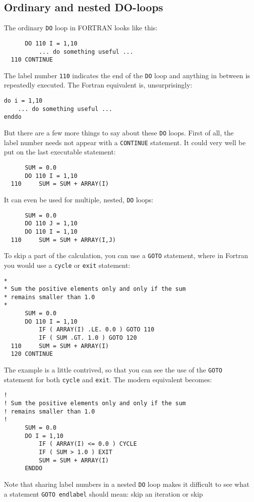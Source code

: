 \subsection{Ordinary and nested DO-loops}
The ordinary \verb+DO+ loop in FORTRAN looks like this:
%
\begin{verbatim}
      DO 110 I = 1,10
          ... do something useful ...
  110 CONTINUE
\end{verbatim}
%
The label number \verb+110+ indicates the end of the \verb+DO+ loop and anything in between
is repeatedly executed. The Fortran equivalent is, unsurprisingly:
%
\begin{verbatim}
do i = 1,10
    ... do something useful ...
enddo
\end{verbatim}
%
But there are a few more things to say about these \verb+DO+ loops. First of all, the
label number needs not appear with a \verb+CONTINUE+ statement. It could very well be
put on the last executable statement:
%
\begin{verbatim}
      SUM = 0.0
      DO 110 I = 1,10
  110     SUM = SUM + ARRAY(I)
\end{verbatim}
%
It can even be used for multiple, nested, \verb+DO+ loops:
%
\begin{verbatim}
      SUM = 0.0
      DO 110 J = 1,10
      DO 110 I = 1,10
  110     SUM = SUM + ARRAY(I,J)
\end{verbatim}
%
To skip a part of the calculation, you can use a \verb+GOTO+ statement, where in Fortran
you would use a \verb+cycle+ or \verb+exit+ statement:
%
\begin{verbatim}
*
* Sum the positive elements only and only if the sum
* remains smaller than 1.0
*
      SUM = 0.0
      DO 110 I = 1,10
          IF ( ARRAY(I) .LE. 0.0 ) GOTO 110
          IF ( SUM .GT. 1.0 ) GOTO 120
  110     SUM = SUM + ARRAY(I)
  120 CONTINUE
\end{verbatim}
%
The example is a little contrived, so that you can see the use of the \verb+GOTO+ statement
for both \verb+cycle+ and \verb+exit+. The modern equivalent becomes:
%
\begin{verbatim}
!
! Sum the positive elements only and only if the sum
! remains smaller than 1.0
!
      SUM = 0.0
      DO I = 1,10
          IF ( ARRAY(I) <= 0.0 ) CYCLE
          IF ( SUM > 1.0 ) EXIT
          SUM = SUM + ARRAY(I)
      ENDDO
\end{verbatim}
%
Note that sharing label numbers in a nested \verb+DO+ loop makes it difficult to
see what a statement \verb+GOTO endlabel+ should mean: skip an iteration or skip
